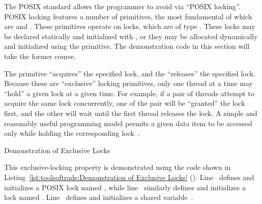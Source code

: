 The POSIX standard allows the programmer to avoid  via
``POSIX locking''.
POSIX locking features a number of primitives, the most fundamental
of which are  and .
These primitives operate on locks, which are of type .
These locks may be declared statically and initialized with
, or they may be allocated dynamically
and initialized using the  primitive.
The demonstration code in this section will take the former course.

The  primitive ``acquires'' the specified lock,
and the  ``releases'' the specified lock.
Because these are ``exclusive'' locking primitives,
only one thread at a time may ``hold'' a given lock at a given time.
For example, if a pair of threads attempt to acquire the same lock
concurrently, one of the pair will be ``granted'' the lock first, and
the other will wait until the first thread releases the lock.
A simple and reasonably useful programming model permits a given data item
to be accessed only while holding the corresponding
lock~\cite{Hoare74}.

\QuickQuizEnd

\begin{listing}[tbp]
\caption{Demonstration of Exclusive Locks}
\label{lst:toolsoftrade:Demonstration of Exclusive Locks}
\end{listing}

\begin{fcvref}
This exclusive-locking property is demonstrated using the code shown in
Listing~\ref{lst:toolsoftrade:Demonstration of Exclusive Locks}
().
Line~ defines and initializes a POSIX lock named , while
line~ similarly defines and initializes a lock named .
Line~ defines and initializes a shared variable~.
\end{fcvref}

